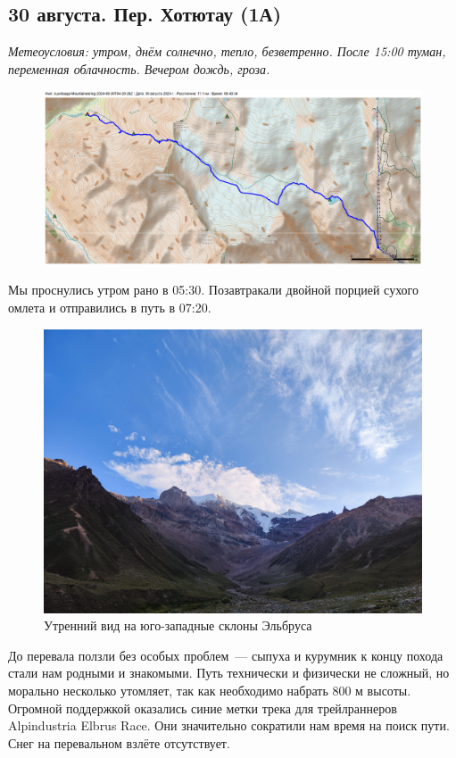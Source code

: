 \subsection{30 августа. Пер. Хотютау (1А)}
\textit{Метеоусловия: утром, днём солнечно, тепло, безветренно. После 15:00 туман, переменная облачность. Вечером дождь, гроза.}

\begin{figure}[h!]
	\centering
	\includegraphics[angle=0, width=0.7\linewidth]{../pics/mini_maps/30}
	\label{fig:mini_30}
\end{figure}





Мы проснулись утром рано в 05:30. Позавтракали двойной порцией сухого омлета и отправились в путь в 07:20.

\begin{figure}[h!]
	\centering
	\includegraphics[width=0.7\linewidth]{../pics/IMG_20240830_063548}
	\caption{Утренний вид на юго-западные склоны Эльбруса}
	\label{fig:IMG_20240830_063548}
\end{figure}

До перевала ползли без особых проблем~--- сыпуха и курумник к концу похода стали нам родными и знакомыми. Путь технически и физически не сложный, но морально несколько утомляет, так как необходимо набрать 800 м высоты. Огромной поддержкой оказались синие метки трека для трейлраннеров Alpindustria Elbrus Race. Они значительно сократили нам время на поиск пути. Снег на перевальном взлёте отсутствует.


